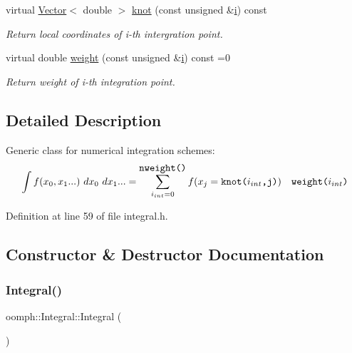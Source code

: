 \begin{DoxyCompactItemize}
virtual \hyperlink{classoomph_1_1Vector}{Vector}$<$ double $>$ \hyperlink{classoomph_1_1Integral_a36c9d8e83acfd47254b284bb05733e46}{knot} (const unsigned \&\hyperlink{cfortran_8h_adb50e893b86b3e55e751a42eab3cba82}{i}) const
\begin{DoxyCompactList}\small\item\em Return local coordinates of i-\/th intergration point. \end{DoxyCompactList}\item 
virtual double \hyperlink{classoomph_1_1Integral_ac65335e2aab120b285b3d6c294507b06}{weight} (const unsigned \&\hyperlink{cfortran_8h_adb50e893b86b3e55e751a42eab3cba82}{i}) const =0
\begin{DoxyCompactList}\small\item\em Return weight of i-\/th integration point. \end{DoxyCompactList}\end{DoxyCompactItemize}


\subsection{Detailed Description}
Generic class for numerical integration schemes\+: \[ \int f(x_0,x_1...)\ dx_0 \ dx_1... = \sum_{i_{int}=0}^{\mbox{\tt nweight()} } f( x_j=\mbox{\tt knot($i_{int}$,j)} ) \ \ \ \mbox{\tt weight($i_{int}$)} \] 

Definition at line 59 of file integral.\+h.



\subsection{Constructor \& Destructor Documentation}
\mbox{\label{classoomph_1_1Integral_a68e50805e1859191361da2be4e89b9a8}} 
\subsubsection{\texorpdfstring{Integral()}{Integral()}\hspace{0.1cm}{\footnotesize\ttfamily [1/2]}}
{\footnotesize\ttfamily oomph\+::\+Integral\+::\+Integral (\begin{DoxyParamCaption}{ }\end{DoxyParamCaption})\hspace{0.3cm}{\ttfamily [inline]}}



